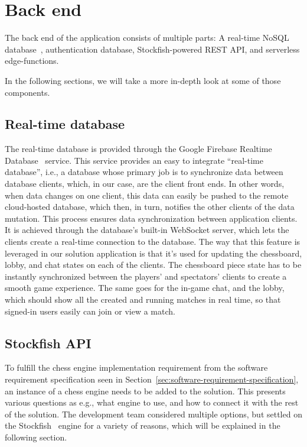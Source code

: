 \section{Back end}\label{sec:backend}

The back end of the application consists of multiple parts: A real-time NoSQL database~\cite{nosql}, authentication
database, Stockfish-powered REST API, and serverless edge-functions.

In the following sections, we will take a more in-depth look at some of those components.

\subsection{Real-time database}\label{subsec:real-time-database}

The real-time database is provided through the Google Firebase Realtime Database~\cite{realtime-database} service.
This service provides an easy to integrate ``real-time database'', i.e., a database whose primary job is to synchronize
data between database clients, which, in our case, are the client front ends.
In other words, when data changes on one client, this data can easily be pushed to the remote cloud-hosted database,
which then, in turn, notifies the other clients of the data mutation.
This process ensures data synchronization between application clients.
It is achieved through the database's built-in WebSocket server, which lets the clients create a real-time connection
to the database.
The way that this feature is leveraged in our solution application is that it's used for updating the chessboard, lobby,
and chat states on each of the clients.
The chessboard piece state has to be instantly synchronized between the players' and spectators'
clients to create a smooth game experience.
The same goes for the in-game chat, and the lobby, which should show all the created and running matches in real time,
so that signed-in users easily can join or view a match.

\subsection{Stockfish API}\label{subsec:stockfish-api}

To fulfill the chess engine implementation requirement from the software requirement specification seen in
Section~\ref{sec:software-requirement-specification}, an instance of a chess engine needs to be added to the solution.
This presents various questions as e.g., what engine to use, and how to connect it with the rest of the solution.
The development team considered multiple options,
but settled on the Stockfish~\cite{stockfish} engine for a variety of reasons, which will be explained in the following
section.

